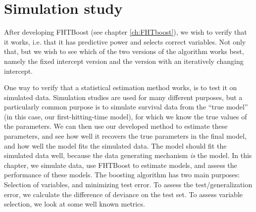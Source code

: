 \chapter{Simulation study}
After developing FHTBoost (see chapter \ref{ch:FHTboost}), we wish to verify that it works, i.e. that it has predictive power and selects correct variables.
Not only that, but we wish to see which of the two versions of the algorithm works best, namely the fixed intercept version and the version with an iteratively changing intercept.

One way to verify that a statistical estimation method works, is to test it on simulated data.
Simulation studies are used for many different purposes, but a particularly common purpose is to simulate survival data from the ``true model'' (in this case, our first-hitting-time model), for which we know the true values of the parameters.
We can then use our developed method to estimate these parameters, and see how well it recovers the true parameters in the final model, and how well the model fits the simulated data.
The model should fit the simulated data well, because the data generating mechanism \textit{is} the model.
In this chapter, we simulate data, use FHTBoost to estimate models, and assess the performance of these models.
The boosting algorithm has two main purposes:
Selection of variables, and minimizing test error.
To assess the test/generalization error, we calculate the difference of deviance on the test set.
To assess variable selection, we look at some well known metrics.

